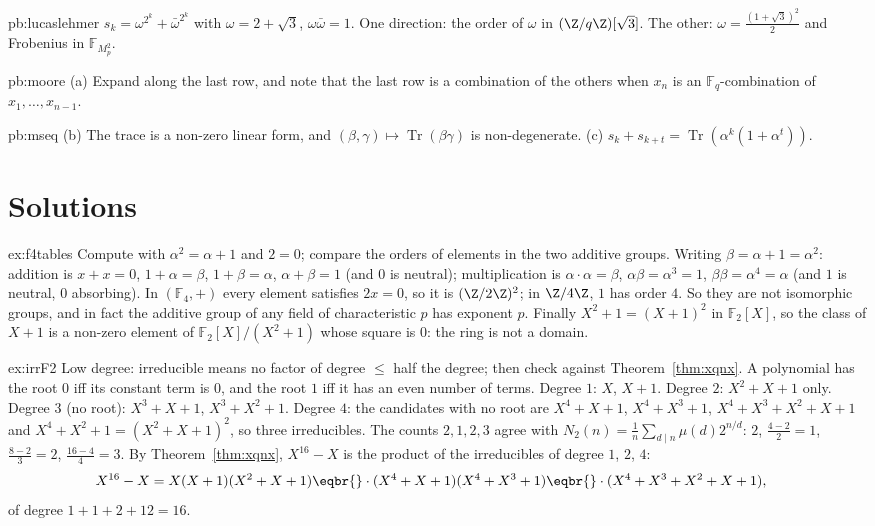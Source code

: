 \begin{hint}{pb:lucaslehmer}
$s_k=\omega^{2^k}+\bar\omega^{2^k}$ with $\omega=2+\sqrt3$, $\omega\bar\omega=1$. One direction: the order of $\omega$ in
$(\Z/q\Z)[\sqrt3]$. The other: $\omega=\frac{(1+\sqrt3)^2}2$ and Frobenius in $\mathbb F_{M_p^2}$.
\end{hint}

\begin{hint}{pb:moore}
(a) Expand along the last row, and note that the last row is a combination of the others when $x_n$ is an $\mathbb F_q$-combination
of $x_1,\dots,x_{n-1}$.
\end{hint}

\begin{hint}{pb:mseq}
(b) The trace is a non-zero linear form, and $(\beta,\gamma)\mapsto\operatorname{Tr}(\beta\gamma)$ is non-degenerate.
(c) $s_k+s_{k+t}=\operatorname{Tr}(\alpha^k(1+\alpha^t))$.
\end{hint}

\section{Solutions}

\begin{solution}{ex:f4tables}
\idea Compute with $\alpha^2=\alpha+1$ and $2=0$; compare the orders of elements in the two additive groups.
\writeup Writing $\beta=\alpha+1=\alpha^2$: addition is $x+x=0$, $1+\alpha=\beta$, $1+\beta=\alpha$, $\alpha+\beta=1$ (and $0$ is neutral); multiplication is $\alpha\cdot\alpha=\beta$, $\alpha\beta=\alpha^3=1$, $\beta\beta=\alpha^4=\alpha$ (and $1$ is neutral, $0$ absorbing). In $(\mathbb F_4,+)$ every element satisfies $2x=0$, so it is $(\Z/2\Z)^2$; in $\Z/4\Z$, $1$ has order $4$. So they are not isomorphic groups, and in fact the additive group of any field of characteristic $p$ has exponent $p$. Finally $X^2+1=(X+1)^2$ in $\mathbb F_2[X]$, so the class of $X+1$ is a non-zero element of $\mathbb F_2[X]/(X^2+1)$ whose square is $0$: the ring is not a domain.
\end{solution}

\begin{solution}{ex:irrF2}
\idea Low degree: irreducible means no factor of degree $\le$ half the degree; then check against Theorem~\ref{thm:xqnx}.
\writeup A polynomial has the root $0$ iff its constant term is $0$, and the root $1$ iff it has an even number of terms. Degree $1$: $X$, $X+1$. Degree $2$: $X^2+X+1$ only. Degree $3$ (no root): $X^3+X+1$, $X^3+X^2+1$. Degree $4$: the candidates with no root are $X^4+X+1$, $X^4+X^3+1$, $X^4+X^3+X^2+X+1$ and $X^4+X^2+1=(X^2+X+1)^2$, so three irreducibles. The counts $2,1,2,3$ agree with $N_2(n)=\frac1n\sum_{d\mid n}\mu(d)2^{n/d}$: $2$, $\frac{4-2}2=1$, $\frac{8-2}3=2$, $\frac{16-4}4=3$. By Theorem~\ref{thm:xqnx}, $X^{16}-X$ is the product of the irreducibles of degree $1$, $2$, $4$:
\[
\begin{aligned}
X^{16}-X&=X(X+1)(X^2+X+1)\eqbr{}\cdot(X^4+X+1)(X^4+X^3+1)\eqbr{}\cdot(X^4+X^3+X^2+X+1),
\end{aligned}
\]
of degree $1+1+2+12=16$.
\end{solution}

